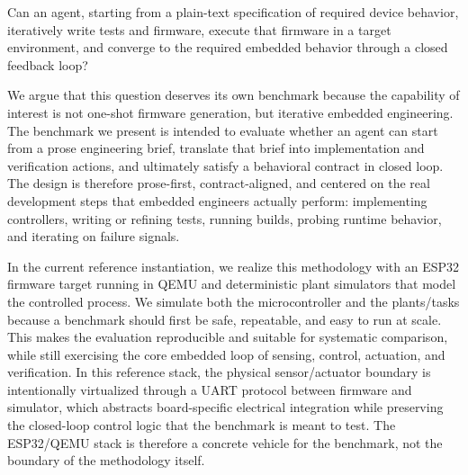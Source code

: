 \documentclass[a4paper,fleqn]{cas-dc}
\begin{document}
\begin{center}
\colorbox{black!6}{%
\parbox{0.93\columnwidth}{%
Can an agent, starting from a plain-text specification of required device behavior, iteratively write tests and firmware, execute that firmware in a target environment, and converge to the required embedded behavior through a closed feedback loop?%
}}
\end{center}

We argue that this question deserves its own benchmark because the capability of interest is not one-shot firmware generation, but iterative embedded engineering. The benchmark we present is intended to evaluate whether an agent can start from a prose engineering brief, translate that brief into implementation and verification actions, and ultimately satisfy a behavioral contract in closed loop. The design is therefore prose-first, contract-aligned, and centered on the real development steps that embedded engineers actually perform: implementing controllers, writing or refining tests, running builds, probing runtime behavior, and iterating on failure signals.

In the current reference instantiation, we realize this methodology with an ESP32 firmware target running in QEMU \cite{systems_sim_eval} and deterministic plant simulators that model the controlled process. We simulate both the microcontroller and the plants/tasks because a benchmark should first be safe, repeatable, and easy to run at scale. This makes the evaluation reproducible and suitable for systematic comparison, while still exercising the core embedded loop of sensing, control, actuation, and verification. In this reference stack, the physical sensor/actuator boundary is intentionally virtualized through a UART protocol between firmware and simulator, which abstracts board-specific electrical integration while preserving the closed-loop control logic that the benchmark is meant to test. The ESP32/QEMU stack is therefore a concrete vehicle for the benchmark, not the boundary of the methodology itself.
\end{document}
